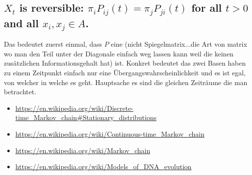 \subsection{$X_t$ is reversible: $\pi_i P_{ij} (t) = \pi_j P_{ji} (t)$ for all $t > 0$ and all $x_i , x_j \in A$.}
Das bedeutet zuerst einmal, dass $P$ eine (nicht Spiegelmatrix...die Art von matrix wo man den Teil unter der Diagonale einfach weg lassen kann weil die keinen zusätzlichen Informationsgehalt hat) ist. Konkret bedeutet das zwei Basen haben zu einem Zeitpunkt einfach nur eine Übergangswahrscheinlichkeit und es ist egal, von welcher in welche es geht. Hauptsache es sind die gleichen Zeiträume die man betrachtet. 
 
\begin{itemize}
    \item \url{https://en.wikipedia.org/wiki/Discrete-time_Markov_chain#Stationary_distributions}
    \item \url{https://en.wikipedia.org/wiki/Continuous-time_Markov_chain}
    \item \url{https://en.wikipedia.org/wiki/Markov_chain}
    \item \url{https://en.wikipedia.org/wiki/Models_of_DNA_evolution    }
\end{itemize}